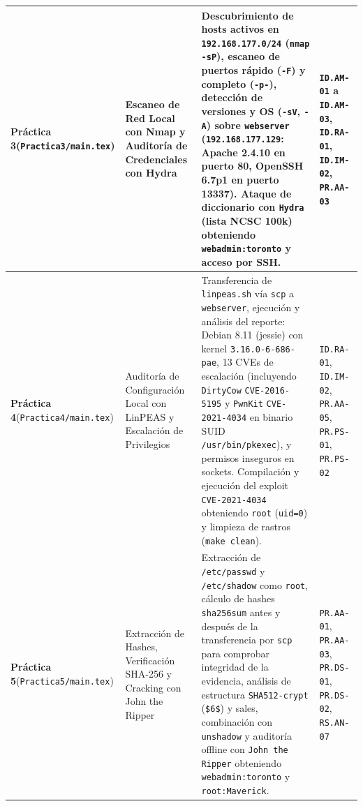 \documentclass[letterpaper,11pt]{article}
\begin{document}
\begin{longtable}{|L{2.8cm}|L{3.5cm}|L{6.2cm}|C{3.8cm}|}
\textbf{Práctica 3}\newline (\texttt{Practica3/main.tex}) &
Escaneo de Red Local con Nmap y Auditoría de Credenciales con Hydra &
Descubrimiento de hosts activos en \texttt{192.168.177.0/24} (\texttt{nmap -sP}), escaneo de puertos rápido (\texttt{-F}) y completo (\texttt{-p-}), detección de versiones y OS (\texttt{-sV}, \texttt{-A}) sobre \texttt{webserver} (\texttt{192.168.177.129}: Apache 2.4.10 en puerto 80, OpenSSH 6.7p1 en puerto 13337). Ataque de diccionario con \texttt{Hydra} (lista NCSC 100k) obteniendo \texttt{webadmin:toronto} y acceso por SSH. &
\texttt{ID.AM-01} a \texttt{ID.AM-03}, \texttt{ID.RA-01}, \texttt{ID.IM-02}, \texttt{PR.AA-03} \\
\hline

\textbf{Práctica 4}\newline (\texttt{Practica4/main.tex}) &
Auditoría de Configuración Local con LinPEAS y Escalación de Privilegios &
Transferencia de \texttt{linpeas.sh} vía \texttt{scp} a \texttt{webserver}, ejecución y análisis del reporte: Debian 8.11 (jessie) con kernel \texttt{3.16.0-6-686-pae}, 13 CVEs de escalación (incluyendo \texttt{DirtyCow} \texttt{CVE-2016-5195} y \texttt{PwnKit} \texttt{CVE-2021-4034} en binario SUID \texttt{/usr/bin/pkexec}), y permisos inseguros en sockets. Compilación y ejecución del exploit \texttt{CVE-2021-4034} obteniendo \texttt{root} (\texttt{uid=0}) y limpieza de rastros (\texttt{make clean}). &
\texttt{ID.RA-01}, \texttt{ID.IM-02}, \texttt{PR.AA-05}, \texttt{PR.PS-01}, \texttt{PR.PS-02} \\
\hline

\textbf{Práctica 5}\newline (\texttt{Practica5/main.tex}) &
Extracción de Hashes, Verificación SHA-256 y Cracking con John the Ripper &
Extracción de \texttt{/etc/passwd} y \texttt{/etc/shadow} como \texttt{root}, cálculo de hashes \texttt{sha256sum} antes y después de la transferencia por \texttt{scp} para comprobar integridad de la evidencia, análisis de estructura \texttt{SHA512-crypt} (\texttt{\$6\$}) y sales, combinación con \texttt{unshadow} y auditoría offline con \texttt{John the Ripper} obteniendo \texttt{webadmin:toronto} y \texttt{root:Maverick}. &
\texttt{PR.AA-01}, \texttt{PR.AA-03}, \texttt{PR.DS-01}, \texttt{PR.DS-02}, \texttt{RS.AN-07} \\
\hline


\end{longtable}
\end{document}
